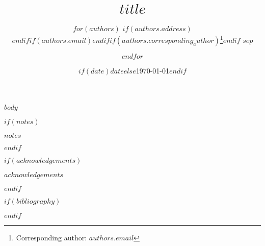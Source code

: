 \documentclass[$if(fontsize)$$fontsize$,$else$12pt,$endif$$if(spacing)$$spacing$,$else$halfline,$endif$$if(papersize)$$papersize$,$else$a4paper,$endif$$for(classoptions)$$classoptions$$sep$,$endfor$]{ouparticle}
\begin{document}
\title{$title$}

\author{%
$for(authors)$
$if(authors.address)$\address{$authors.address$}$endif$$if(authors.email)$$endif$$if(authors.corresponding_author)$\thanks{Corresponding author: $authors.email$}$endif$
$sep$\and
$endfor$
}


\date{$if(date)$$date$$else$\today$endif$}


\maketitle

$body$

$if(notes)$
\begin{notes}
$notes$
\end{notes}
$endif$

$if(acknowledgements)$
\begin{notes}[Acknowledgements]
$acknowledgements$
\end{notes}
$endif$

$if(bibliography)$

$endif$
\end{document}
